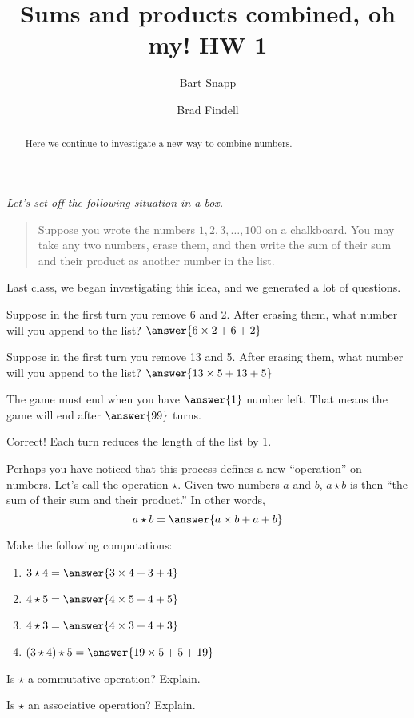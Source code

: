 \documentclass{ximera}
\title{Sums and products combined, oh my!  HW 1}
\author{Bart Snapp \and Brad Findell}
\begin{document}
\begin{abstract}
Here we continue to investigate a new way to combine numbers.
\end{abstract}
\maketitle

\emph{Let's set off the following situation in a box.} 
\begin{quote}
Suppose you wrote the numbers $1,2,3,\dots,100$ on a chalkboard. You
may take any two numbers, erase them, and then write the sum of their
sum and their product as another number in the list.
\end{quote}
Last class, we began investigating this idea, and we generated a lot
of questions.  

\begin{problem}
Suppose in the first turn you remove 6 and 2.  After erasing them, what number will you append to the list?  $\answer{6\times 2+6+2}$
\end{problem}

\begin{problem}
Suppose in the first turn you remove 13 and 5.  After erasing them, what number will you append to the list?  $\answer{13\times 5+13+5}$
\end{problem}

\begin{problem}
The game must end when you have $\answer{1}$ number left.  That means the game will end after $\answer{99}$ turns.
\begin{feedback}[correct]
Correct!  Each turn reduces the length of the list by 1.
\end{feedback}
\end{problem}

\begin{problem}
Perhaps you have noticed that this process defines a new ``operation'' on numbers.  Let's
call the operation $\star$.  Given two numbers $a$ and $b$, $a\star b$
is then ``the sum of their sum and their product.''  In other words, 
\[
a\star b = \answer{a\times b+a+b}
\]
\end{problem}

\begin{problem}
Make the following computations:
\begin{enumerate}
\item $3\star 4= \answer{3\times 4+3+4}$
\item $4\star 5= \answer{4\times 5+4+5}$
\item $4\star 3= \answer{4\times 3+4+3}$
\item $(3\star 4)\star 5 = \answer{19\times 5+5+19}$
\end{enumerate}
\end{problem}


\begin{problem}
Is $\star$ a commutative operation?  Explain.  
\begin{freeResponse}
\end{freeResponse}
\end{problem}


\begin{problem}
Is $\star$ an associative operation?  Explain.  
\begin{freeResponse}
\end{freeResponse}
\end{problem}
\end{document}
